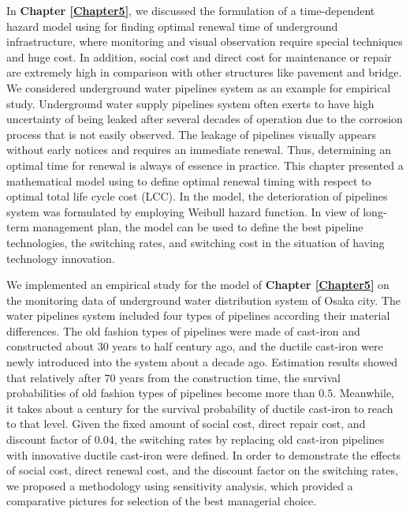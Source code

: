 In \textbf{Chapter \ref{Chapter5}}, we discussed the formulation of a time-dependent hazard model using for finding optimal renewal time of underground infrastructure, where monitoring and visual observation require special techniques and huge cost. In addition, social cost and direct cost for maintenance or repair are extremely high in comparison with other structures like pavement and bridge. We considered underground water pipelines system as an example for empirical study. Underground water supply pipelines system often exerts to have high uncertainty of being leaked after several decades of operation due to the corrosion process that is not easily observed. The leakage of pipelines visually appears without early notices and requires an immediate renewal. Thus, determining an optimal time for renewal is always of essence in practice. This chapter presented a mathematical model using to define optimal renewal timing with respect to optimal total life cycle cost (LCC). In the model, the deterioration of pipelines system was formulated by employing Weibull hazard function. In view of long-term management plan, the model can be used to define the best pipeline technologies, the switching rates, and switching cost in the situation of having technology innovation.

We implemented an empirical study for the model of \textbf{Chapter \ref{Chapter5}} on the monitoring data of underground water distribution system of Osaka city. The water pipelines system included four types of pipelines according their material differences. The old fashion types of pipelines were made of cast-iron and constructed about $30$ years to half century ago, and the ductile cast-iron were newly introduced into the system about a decade ago. Estimation results showed that relatively after $70$ years from the construction time, the survival probabilities of old fashion types of pipelines become more than $0.5$. Meanwhile, it takes about a century for the survival probability of ductile cast-iron to reach to that level. Given the fixed amount of social cost, direct repair cost, and discount factor of $0.04$, the switching rates by replacing old cast-iron pipelines with innovative ductile cast-iron were defined. In order to demonstrate the effects of social cost, direct renewal cost, and the discount factor on the switching rates, we proposed a methodology using sensitivity analysis, which provided a comparative pictures for selection of the best managerial choice.

